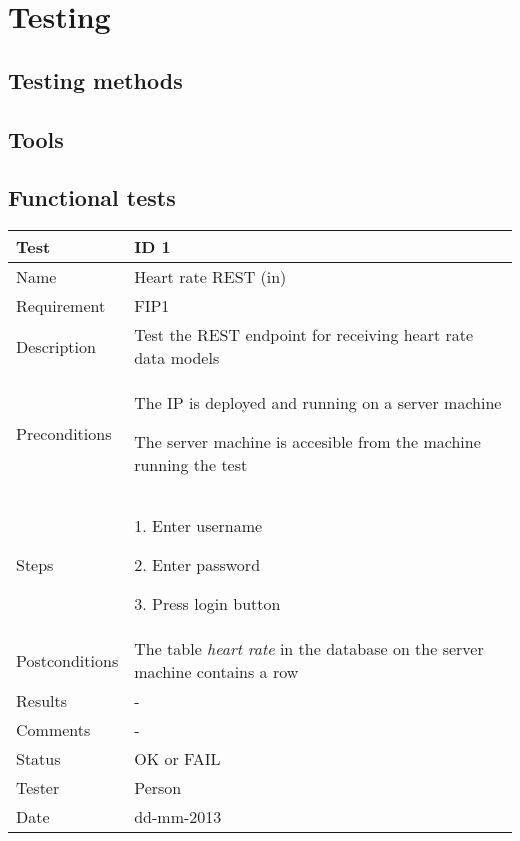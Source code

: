 
\chapter{Testing}

\label{Testing}


\section{Testing methods}

\section{Tools}

\section{Functional tests}

\begin{table}
\begin{center}
\begin{tabular}{ | l | p{10cm} | }
	\hline
	\textbf{Test}	&	\textbf{ID 1} \\
	\hline\noalign{\smallskip}\noalign{\smallskip}\hline
	Name				& Heart rate REST (in) \\
	Requirement			& FIP1 \\
	Description			& Test the REST endpoint for receiving heart rate data models \\
	Preconditions		& 	\par The IP is deployed and running on a server machine 
							\par The server machine is accesible from the machine running the test \\
	Steps 				&	\par 1. Enter username
							\par 2. Enter password
							\par 3. Press login button \\
	Postconditions		& The table \textit{heart rate} in the database on the server machine contains a row \\
	Results				& - \\
	Comments			& - \\
	Status				& OK or FAIL \\
	Tester				& Person \\
	Date				& dd-mm-2013 \\
	\hline
\end{tabular}
\end{center}
\end{table}

